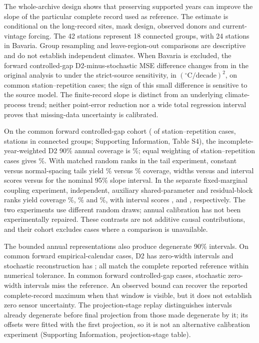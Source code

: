 \documentclass[draft,linenumbers]{agujournal2025}
\begin{document}
The whole-archive design shows that preserving supported years can improve the slope of the particular complete record used as reference. The estimate is conditional on the long-record sites, mask design, observed donors and current-vintage forcing. The 42 stations represent 18 connected groups, with 24 stations in Bavaria. Group resampling and leave-region-out comparisons are descriptive and do not establish independent climates. When Bavaria is excluded, the forward controlled-gap D2-minus-stochastic MSE difference changes from \SRBayernCrossOld{} in the original analysis to \SRBayernCrossNew{} under the strict-source sensitivity, in $({}^{\circ}\mathrm{C}/\mathrm{decade})^2$, on \SRBayernCrossN{} common station--repetition cases; the sign of this small difference is sensitive to the source model. The finite-record slope is distinct from an underlying climate-process trend; neither point-error reduction nor a wide total regression interval proves that missing-data uncertainty is calibrated.

On the common forward controlled-gap cohort (\UCCommon{} of \UCAll{} station--repetition cases, \UCStations{} stations in \UCGroups{} connected groups; Supporting Information, Table S4), the incomplete-year-weighted D2 90\% annual coverage is \UCAnnual\%; equal weighting of station--repetition cases gives \UCAnnualEqual\%. With matched random ranks in the tail experiment, constant versus normal-spacing tails yield \UCTailConstant\% versus \UCTailNormal\% coverage, widths \UCTailWidthConstant{} versus \UCTailWidthNormal{} and interval scores \UCTailScoreConstant{} versus \UCTailScoreNormal{} for the nominal 95\% slope interval. In the separate fixed-marginal coupling experiment, independent, auxiliary shared-parameter and residual-block ranks yield coverage \UCIndependent\%, \UCShared\% and \UCBlocks\%, with interval scores \UCIndependentScore{}, \UCSharedScore{} and \UCBlocksScore{}, respectively. The two experiments use different random draws; annual calibration has not been experimentally repaired. These contrasts are not additive causal contributions, and their cohort excludes cases where a comparison is unavailable.

The bounded annual representations also produce degenerate 90\% intervals. On \SPCalendarCommon{} common forward empirical-calendar cases, D2 has \SPCalendarDTwoZero{} zero-width intervals and stochastic reconstruction has \SPCalendarClassicZero{}; all match the complete reported reference within numerical tolerance. In \SPCrossCommon{} common forward controlled-gap cases, \SPCrossClassicMiss{} stochastic zero-width intervals miss the reference. An observed bound can recover the reported complete-record maximum when that window is visible, but it does not establish zero sensor uncertainty. The projection-stage replay distinguishes intervals already degenerate before final projection from those made degenerate by it; its offsets were fitted with the first projection, so it is not an alternative calibration experiment (Supporting Information, projection-stage table).
\end{document}
